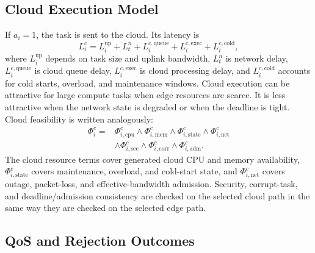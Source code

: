 \subsection{Cloud Execution Model}

If $a_i=1$, the task is sent to the cloud. Its latency is
\begin{equation}
L_i^{c}=L^{\mathrm{up}}_i + L^{n}_t + L^{c,\mathrm{queue}}_i + L^{c,\mathrm{exec}}_i + L^{c,\mathrm{cold}}_i,
\label{eq:cloud_latency}
\end{equation}
where $L^{\mathrm{up}}_i$ depends on task size and uplink bandwidth, $L^n_t$ is network delay, $L^{c,\mathrm{queue}}_i$ is cloud queue delay, $L^{c,\mathrm{exec}}_i$ is cloud processing delay, and $L^{c,\mathrm{cold}}_i$ accounts for cold starts, overload, and maintenance windows. Cloud execution can be attractive for large compute tasks when edge resources are scarce. It is less attractive when the network state is degraded or when the deadline is tight. Cloud feasibility is written analogously:
\begin{equation}
\begin{aligned}
\Phi_i^c={}&
\Phi_{i,\mathrm{cpu}}^c
\land \Phi_{i,\mathrm{mem}}^c
\land \Phi_{i,\mathrm{state}}^c
\land \Phi_{i,\mathrm{net}}^c \\
&\land \Phi_{i,\mathrm{sec}}^c
\land \Phi_{i,\mathrm{corr}}^c
\land \Phi_{i,\mathrm{adm}}^c .
\end{aligned}
\label{eq:cloud_feasibility}
\end{equation}
The cloud resource terms cover generated cloud CPU and memory availability, $\Phi_{i,\mathrm{state}}^c$ covers maintenance, overload, and cold-start state, and $\Phi_{i,\mathrm{net}}^c$ covers outage, packet-loss, and effective-bandwidth admission. Security, corrupt-task, and deadline/admission consistency are checked on the selected cloud path in the same way they are checked on the selected edge path.

\subsection{QoS and Rejection Outcomes}

